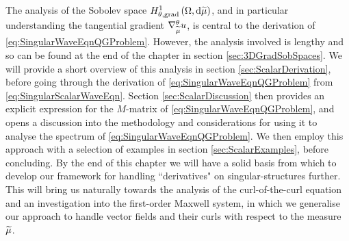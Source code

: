 The analysis of the Sobolev space $H^1_{\theta, \mathrm{grad}}\left( \Omega, \mathrm{d}\widetilde{\mu} \right)$, and in particular understanding the tangential gradient $\nabla^{\theta}_{\widetilde{\mu}}u$, is central to the derivation of \eqref{eq:SingularWaveEqnQGProblem}. 
However, the analysis involved is lengthy and so can be found at the end of the chapter in section \ref{sec:3DGradSobSpaces}.
We will provide a short overview of this analysis in section \ref{sec:ScalarDerivation}, before going through the derivation of \eqref{eq:SingularWaveEqnQGProblem} from \eqref{eq:SingularScalarWaveEqn}.
Section \ref{sec:ScalarDiscussion} then provides an explicit expression for the $M$-matrix of \eqref{eq:SingularWaveEqnQGProblem}, and opens a discussion into the methodology and considerations for using it to analyse the spectrum of \eqref{eq:SingularWaveEqnQGProblem}.
We then employ this approach with a selection of examples in section \ref{sec:ScalarExamples}, before concluding.
By the end of this chapter we will have a solid basis from which to develop our framework for handling ``derivatives" on singular-structures further. 
This will bring us naturally towards the analysis of the curl-of-the-curl equation  and an investigation into the first-order Maxwell system, in which we generalise our approach to handle vector fields and their curls with respect to the measure $\widetilde{\mu}$.




%

%


